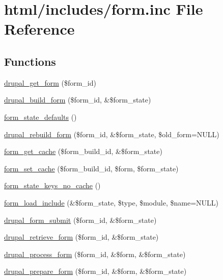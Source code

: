\hypertarget{includes_2form_8inc}{
\section{html/includes/form.inc File Reference}
\label{includes_2form_8inc}
}
\subsection*{Functions}
\begin{DoxyCompactItemize}
\item 
\hyperlink{group__form__api_ga720df81a837b06dfe19daf1c1eea3437}{drupal\_\-get\_\-form} (\$form\_\-id)
\item 
\hyperlink{group__form__api_gabead4b3c089fd605421d371a0315c4d7}{drupal\_\-build\_\-form} (\$form\_\-id, \&\$form\_\-state)
\item 
\hyperlink{group__form__api_ga398705411ef7b0f88e08253a56683987}{form\_\-state\_\-defaults} ()
\item 
\hyperlink{group__form__api_ga72bc81db2eb72bbb1249a7c50d8614e7}{drupal\_\-rebuild\_\-form} (\$form\_\-id, \&\$form\_\-state, \$old\_\-form=NULL)
\item 
\hyperlink{group__form__api_gab1da3001a3773a949188b52f61a9cd09}{form\_\-get\_\-cache} (\$form\_\-build\_\-id, \&\$form\_\-state)
\item 
\hyperlink{group__form__api_ga274fe9a7fe000a43b7f173e3b54dae7f}{form\_\-set\_\-cache} (\$form\_\-build\_\-id, \$form, \$form\_\-state)
\item 
\hyperlink{group__form__api_gabffb5c6a1218bb14db316fe29c4e52af}{form\_\-state\_\-keys\_\-no\_\-cache} ()
\item 
\hyperlink{group__form__api_ga9c29fd030cf29d55e40f849de8dde040}{form\_\-load\_\-include} (\&\$form\_\-state, \$type, \$module, \$name=NULL)
\item 
\hyperlink{group__form__api_ga4312d7fe0602f6359153fc62cba1ca24}{drupal\_\-form\_\-submit} (\$form\_\-id, \&\$form\_\-state)
\item 
\hyperlink{group__form__api_ga82f16e1c86833aa88bf93adf93bae9bb}{drupal\_\-retrieve\_\-form} (\$form\_\-id, \&\$form\_\-state)
\item 
\hyperlink{group__form__api_ga61186f5c43533761544a778918818fd2}{drupal\_\-process\_\-form} (\$form\_\-id, \&\$form, \&\$form\_\-state)
\item 
\hyperlink{group__form__api_ga79309515217249c16c7e4a7117141120}{drupal\_\-prepare\_\-form} (\$form\_\-id, \&\$form, \&\$form\_\-state)

\end{DoxyCompactItemize}
